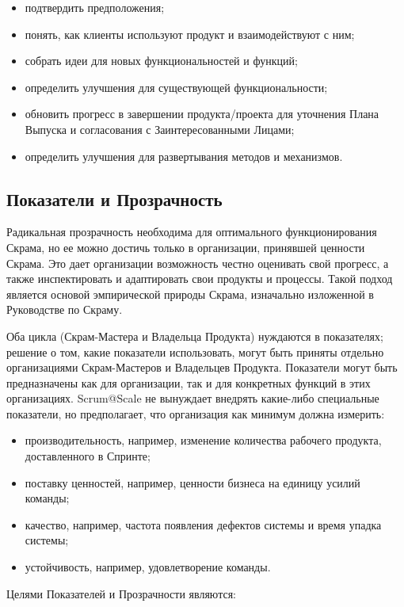 \documentclass[12pt,a4paper,parskip=full]{scrartcl}
\begin{document}
\begin{itemize}
	\item подтвердить предположения;
	\item понять, как клиенты используют продукт и взаимодействуют с ним;
	\item собрать идеи для новых функциональностей и функций;
	\item определить улучшения для существующей функциональности; 
	\item обновить прогресс  в завершении продукта/проекта для уточнения Плана Выпуска и согласования с Заинтересованными Лицами; 
	\item определить улучшения для развертывания методов и механизмов. 
\end{itemize}

\subsection{Показатели и Прозрачность}

Радикальная прозрачность необходима для оптимального функционирования Скрама, но ее можно достичь только в организации, принявшей ценности Скрама. Это дает организации возможность честно оценивать свой прогресс, а также инспектировать и адаптировать свои продукты и процессы. Такой подход является основой эмпирической природы Скрама, изначально изложенной в Руководстве по Скраму.

Оба цикла (Скрам-Мастера и Владельца Продукта) нуждаются в показателях; решение о том, какие показатели использовать, могут быть приняты отдельно организациями Скрам-Мастеров и Владельцев Продукта. Показатели могут быть предназначены как для организации, так и для конкретных функций в этих организациях. Scrum@Scale не вынуждает внедрять какие-либо специальные показатели, но предполагает, что организация как минимум должна измерить:


\begin{itemize}
	\item производительность, например, изменение количества рабочего продукта, доставленного в Спринте;
	\item поставку ценностей, например, ценности бизнеса на единицу усилий команды;
	\item качество, например, частота появления дефектов системы и время упадка системы;
	\item устойчивость, например, удовлетворение команды. 
\end{itemize}

Целями Показателей и Прозрачности являются: 
\end{document}
